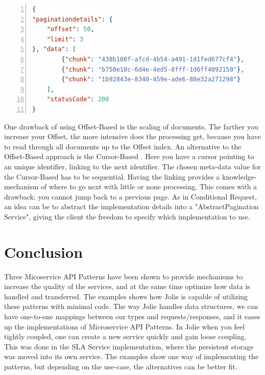 \documentclass[12pt]{article}
\begin{document}
\begin{lstlisting}[caption=The response to the client based on Offset and Limit meta-data, 
    captionpos=b, language=json, label={lst:PaginationResponse}, numbers=left]
{
"paginationdetails": {
    "offset": 50,
    "limit": 3
}, "data": [
        {"chunk": "438b100f-afcd-4b54-a491-1d1fed677cf4"},
        {"chunk": "b750e10c-6d4e-4ed5-8fff-1d6ff4092150"},
        {"chunk": "1b92843e-8340-459e-ade6-88e32a271298"}
    ],
    "statusCode": 200
}
\end{lstlisting}

One drawback of using Offset-Based is the scaling of documents. The farther you increase your Offset, the more intensive does the processing get, because you have to read through all documents up to the Offset index. An alternative to the Offset-Based approach is the Cursor-Based \cite{CursorBased}. Here you have a cursor pointing to an unique identifier, linking to the next identifier. The chosen meta-data value for the Cursor-Based has to be sequential. Having the linking provides a knowledge-mechanism of where to go next with little or none processing. This comes with a drawback: you cannot jump back to a previous page. As in Conditional Request, an idea can be to abstract the implementation details into a "AbstractPagination Service", giving the client the freedom to specify which implementation to use. 

\section{Conclusion}

Three Micoservice API Patterns have been shown to provide mechanisms to increase the quality of the services, and at the same time optimize how data is handled and transferred. The examples shows how Jolie is capable of utilizing these patterns with minimal code. The way Jolie handles data structures, we can have one-to-one mappings between our types and requests/responses, and it eases up the implementations of Microservice API Patterns. In Jolie when you feel tightly coupled, one can create a new service quickly and gain loose coupling. This was done in the SLA Service implementation, where the persistent storage was moved into its own service. The examples show one way of implementing the patterns, but depending on the use-case, the alternatives can be better fit.

\newpage


\end{document}
